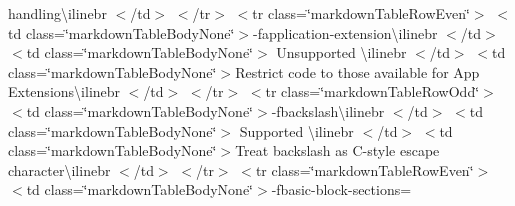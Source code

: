 \begin{longtabu}
handling{\ttfamily \textbackslash{}ilinebr \texorpdfstring{$<$}{<}/td\texorpdfstring{$>$}{>} \texorpdfstring{$<$}{<}/tr\texorpdfstring{$>$}{>} \texorpdfstring{$<$}{<}tr class=\char`\"{}markdown\+Table\+Row\+Even\char`\"{}\texorpdfstring{$>$}{>} \texorpdfstring{$<$}{<}td class=\char`\"{}markdown\+Table\+Body\+None\char`\"{}\texorpdfstring{$>$}{>}}-\/fapplication-\/extension{\ttfamily \textbackslash{}ilinebr \texorpdfstring{$<$}{<}/td\texorpdfstring{$>$}{>} \texorpdfstring{$<$}{<}td class=\char`\"{}markdown\+Table\+Body\+None\char`\"{}\texorpdfstring{$>$}{>} Unsupported \textbackslash{}ilinebr \texorpdfstring{$<$}{<}/td\texorpdfstring{$>$}{>} \texorpdfstring{$<$}{<}td class=\char`\"{}markdown\+Table\+Body\+None\char`\"{}\texorpdfstring{$>$}{>}}Restrict code to those available for App Extensions{\ttfamily \textbackslash{}ilinebr \texorpdfstring{$<$}{<}/td\texorpdfstring{$>$}{>} \texorpdfstring{$<$}{<}/tr\texorpdfstring{$>$}{>} \texorpdfstring{$<$}{<}tr class=\char`\"{}markdown\+Table\+Row\+Odd\char`\"{}\texorpdfstring{$>$}{>} \texorpdfstring{$<$}{<}td class=\char`\"{}markdown\+Table\+Body\+None\char`\"{}\texorpdfstring{$>$}{>}}-\/fbackslash{\ttfamily \textbackslash{}ilinebr \texorpdfstring{$<$}{<}/td\texorpdfstring{$>$}{>} \texorpdfstring{$<$}{<}td class=\char`\"{}markdown\+Table\+Body\+None\char`\"{}\texorpdfstring{$>$}{>} Supported \textbackslash{}ilinebr \texorpdfstring{$<$}{<}/td\texorpdfstring{$>$}{>} \texorpdfstring{$<$}{<}td class=\char`\"{}markdown\+Table\+Body\+None\char`\"{}\texorpdfstring{$>$}{>}}Treat backslash as C-\/style escape character{\ttfamily \textbackslash{}ilinebr \texorpdfstring{$<$}{<}/td\texorpdfstring{$>$}{>} \texorpdfstring{$<$}{<}/tr\texorpdfstring{$>$}{>} \texorpdfstring{$<$}{<}tr class=\char`\"{}markdown\+Table\+Row\+Even\char`\"{}\texorpdfstring{$>$}{>} \texorpdfstring{$<$}{<}td class=\char`\"{}markdown\+Table\+Body\+None\char`\"{}\texorpdfstring{$>$}{>}}-\/fbasic-\/block-\/sections=


\end{longtabu}
